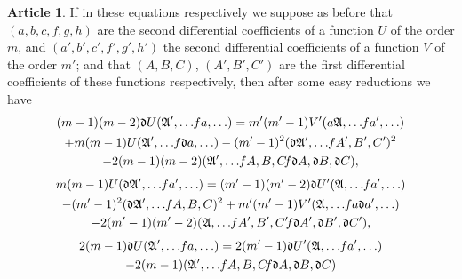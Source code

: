 \documentclass[12pt,a4paper]{article}
\theoremstyle{definition}
\newtheorem{art}{Article}[section]
\begin{document}
\begin{art}
If in these equations respectively we suppose as before that $(a, b, c, f, g, h)$ are the second differential coefficients of a function $U$ of the order $m$, and $(a', b', c', f', g', h')$ the second differential coefficients of a function $V$ of the order $m'$; and that $(A, B, C)$, $(A', B', C')$ are the first differential coefficients of these functions respectively, then after some easy reductions we have
\begin{multline*}
(m - 1)(m - 2)\mathfrak{d}U(\mathfrak{A}', \ldots \hspace{-2pt} fa, \ldots) = m'(m' - 1)V'(a\mathfrak{A}, \ldots \hspace{-2pt} fa', \ldots) \\
+ m(m - 1)U(\mathfrak{A}', \ldots \hspace{-2pt} f\mathfrak{d}a, \ldots) - (m' - 1)^2(\mathfrak{d}\mathfrak{A}', \ldots \hspace{-2pt} fA', B', C')^2 \\
- 2(m - 1)(m - 2)(\mathfrak{A}', \ldots \hspace{-2pt} fA, B, C \hspace{-2pt} f\mathfrak{d}A, \mathfrak{d}B, \mathfrak{d}C),
\end{multline*}
\begin{multline*}
m(m - 1)U(\mathfrak{d}\mathfrak{A}', \ldots \hspace{-2pt} fa', \ldots) = (m' - 1)(m' - 2)\mathfrak{d}U'(\mathfrak{A}, \ldots \hspace{-2pt} fa', \ldots) \\
- (m' - 1)^2(\mathfrak{d}\mathfrak{A}', \ldots \hspace{-2pt} fA, B, C)^2 + m'(m' - 1)V'(\mathfrak{A}, \ldots \hspace{-2pt} fa\mathfrak{d}a', \ldots) \\
- 2(m' - 1)(m' - 2)(\mathfrak{A}, \ldots \hspace{-2pt} fA', B', C' \hspace{-2pt} f\mathfrak{d}A', \mathfrak{d}B', \mathfrak{d}C'),
\end{multline*}
\begin{multline*}
2(m - 1)\mathfrak{d}U(\mathfrak{A}', \ldots \hspace{-2pt} fa, \ldots) = 2(m' - 1)\mathfrak{d}U'(\mathfrak{A}, \ldots \hspace{-2pt} fa', \ldots) \\
- 2(m - 1)(\mathfrak{A}', \ldots \hspace{-2pt} fA, B, C \hspace{-2pt} f\mathfrak{d}A, \mathfrak{d}B, \mathfrak{d}C) \\

\end{multline*}
\end{art}
\end{document}
